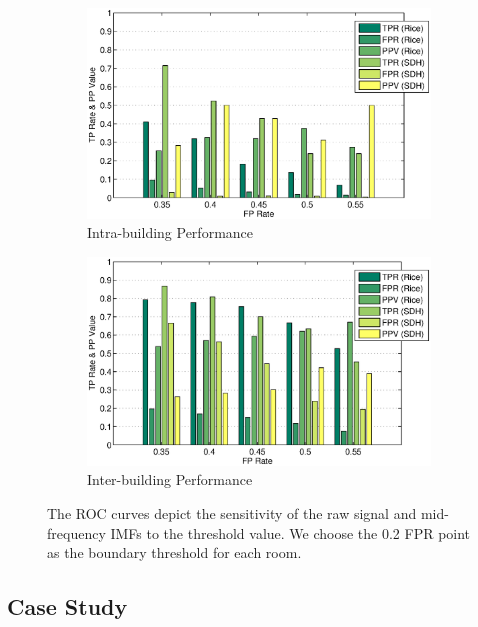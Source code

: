 \begin{figure}[ht]
\centering
	\begin{subfigure}{0.48\textwidth}
                \centering
		\includegraphics[width=\textwidth]{./fig/roc_intra.eps}
                \caption{Intra-building Performance}
                \label{fig:cdf_intra}
	\end{subfigure}
	\begin{subfigure}{0.48\textwidth}
                \centering
		\includegraphics[width=\textwidth]{./fig/roc_inter.eps}
                \caption{Inter-building Performance}
                \label{fig:cdf_inter}
	\end{subfigure}
\caption{The ROC curves depict the sensitivity of the raw signal and mid-frequency IMFs to the threshold value. We choose the 0.2 FPR point as the boundary threshold for each room. }
\label{fig:cdf}
\end{figure}

\subsection{Case Study}
